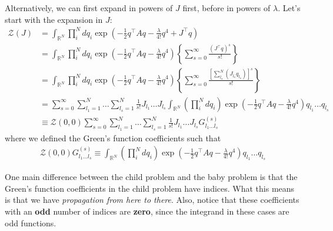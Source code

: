 \documentclass{book}
\theoremstyle{definition}
\newcommand{\f}[2]{\frac{#1}{#2}}
\newcommand{\lp}{\left(}
\newcommand{\rp}{\right)}
\newcommand{\lb}{\left[}
\newcommand{\rb}{\right]}
\newcommand{\lc}{\left\{}
\newcommand{\rc}{\right\}}
\newcommand{\Z}{\mathcal{Z}}
\begin{document}
Alternatively, we can first expand in powers of $J$ first, before in powers of $\lambda$. Let's start with the expansion in $J$:
\begin{align}
\Z(J) &= \int_{\mathbb{R}^N} \prod_i^N dq_i  \exp\lp -\f{1}{2}q^\top A q - \f{\lambda}{4!}q^4 + J^\top q  \rp \nonumber \\ 
&= \int_{\mathbb{R}^N} \prod_i^N dq_i  \exp\lp -\f{1}{2}q^\top A q - \f{\lambda}{4!}q^4 \rp \lc \sum^\infty_{s=0} \f{(J^\top q)^s}{s!}  \rc \nonumber \\ 
&= \int_{\mathbb{R}^N} \prod_i^N dq_i  \exp\lp -\f{1}{2}q^\top A q - \f{\lambda}{4!}q^4 \rp \lc \sum^\infty_{s=0} \f{\lb \sum_{l_s}^N (J_{l_s} q_{l_s}) \rb^s}{s!}  \rc \nonumber \\ 
&= \sum^\infty_{s=0} \sum^N_{l_1 = 1}\dots \sum^N_{l_s = 1} \f{1}{s!}J_{l_1}\dots J_{l_s} \int_{\mathbb{R}^N} \lp\prod_i^N dq_i \rp \exp\lp -\f{1}{2}q^\top A q - \f{\lambda}{4!}q^4 \rp q_{l_1}\dots q_{l_s}\nonumber\\
&\equiv \boxed{\Z(0,0) \sum^\infty_{s=0} \sum^N_{l_1 = 1}\dots \sum^N_{l_s = 1} \f{1}{s!}J_{l_1}\dots J_{l_s} G^{(s)}_{l_1 \dots l_s}}
\end{align}
where we defined the Green's function coefficients such that
\begin{align}
\boxed{\Z(0,0) G^{(s)}_{l_1 \dots l_s} \equiv \int_{\mathbb{R}^N} \lp\prod_i^N dq_i \rp \exp\lp -\f{1}{2}q^\top A q - \f{\lambda}{4!}q^4 \rp q_{l_1}\dots q_{l_s}}
\end{align}


One main difference between the child problem and the baby problem is that the Green's function coefficients in the child problem have indices. What this means is that we have \textit{propagation from here to there}. Also, notice that these coefficients with an \textbf{odd} number of indices are \textbf{zero}, since the integrand in these cases are odd functions. \\
\end{document}
